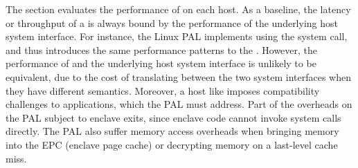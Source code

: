 The section evaluates the performance of \thehostabi{}
on each host.
As a baseline, the latency or throughput
of a \hostapi{} is always bound by the performance of the underlying host system interface.
For instance, the Linux PAL implements 
using the  system call,
and thus introduces the same performance
patterns to the \hostapi{}.
However, the performance of \thehostabi{} and the underlying host system interface
is unlikely to be equivalent,
due to the cost of translating between
the two system interfaces
when they have different semantics. 
Moreover, a host like \sgx{} imposes compatibility challenges
to applications,
which the PAL must address.
Part of the overheads on the \sgx{} PAL
subject to enclave exits,
since enclave code cannot invoke system calls directly.
The \sgx{} PAL
also suffer memory access overheads
when bringing memory into the EPC (enclave page cache)
or decrypting memory
on a last-level cache miss.






